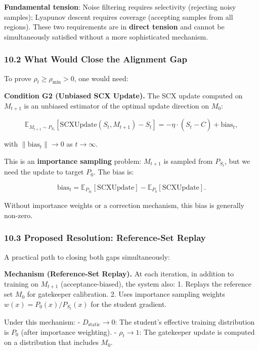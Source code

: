 \documentclass[
  12pt,
]{article}
\begin{document}
\textbf{Fundamental tension}: Noise filtering requires selectivity
(rejecting noisy samples); Lyapunov descent requires coverage (accepting
samples from all regions). These two requirements are in \textbf{direct
tension} and cannot be simultaneously satisfied without a more
sophisticated mechanism.

\subsubsection{10.2 What Would Close the Alignment
Gap}\label{what-would-close-the-alignment-gap}

To prove \(\rho_t \geq \rho_{\min} > 0\), one would need:

\textbf{Condition G2 (Unbiased SCX Update).} The SCX update computed on
\(M_{t+1}\) is an unbiased estimator of the optimal update direction on
\(M_0\):

\[\mathbb{E}_{M_{t+1} \sim P_{S_t}}[\text{SCXUpdate}(S_t, M_{t+1}) - S_t] = -\eta \cdot (S_t - \hat{C}) + \text{bias}_t,\]

with \(\|\text{bias}_t\| \to 0\) as \(t \to \infty\).

This is an \textbf{importance sampling} problem: \(M_{t+1}\) is sampled
from \(P_{S_t}\), but we need the update to target \(P_0\). The bias is:

\[\text{bias}_t = \mathbb{E}_{P_{S_t}}[\text{SCXUpdate}] - \mathbb{E}_{P_0}[\text{SCXUpdate}].\]

Without importance weights or a correction mechanism, this bias is
generally non-zero.

\subsubsection{10.3 Proposed Resolution: Reference-Set
Replay}\label{proposed-resolution-reference-set-replay}

A practical path to closing both gaps simultaneously:

\textbf{Mechanism (Reference-Set Replay).} At each iteration, in
addition to training on \(M_{t+1}\) (acceptance-biased), the system
also: 1. Replays the reference set \(M_0\) for gatekeeper calibration.
2. Uses importance sampling weights \(w(x) = P_0(x) / P_{S_t}(x)\) for
the student gradient.

Under this mechanism: - \textbf{\(D_{\text{static}} \to 0\)}: The
student's effective training distribution is \(P_0\) (after importance
weighting). - \textbf{\(\rho_t \to 1\)}: The gatekeeper update is
computed on a distribution that includes \(M_0\).
\end{document}

